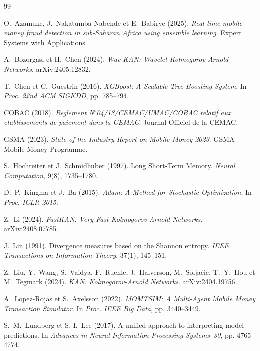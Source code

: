 \documentclass[11pt,a4paper,twocolumn]{article}
\begin{document}
\begin{thebibliography}{99}

O.~Azamuke, J.~Nakatumba-Nabende et E.~Babirye (2025).
\textit{Real-time mobile money fraud detection in sub-Saharan Africa
using ensemble learning}.
Expert Systems with Applications.

A.~Bozorgasl et H.~Chen (2024).
\textit{Wav-KAN: Wavelet Kolmogorov-Arnold Networks}.
arXiv:2405.12832.

T.~Chen et C.~Guestrin (2016).
\textit{XGBoost: A Scalable Tree Boosting System}.
In \textit{Proc. 22nd ACM SIGKDD}, pp. 785--794.

COBAC (2018).
\textit{Reglement N$^{\circ}$04/18/CEMAC/UMAC/COBAC relatif aux
etablissements de paiement dans la CEMAC}.
Journal Officiel de la CEMAC.

GSMA (2023).
\textit{State of the Industry Report on Mobile Money 2023}.
GSMA Mobile Money Programme.

S.~Hochreiter et J.~Schmidhuber (1997).
Long Short-Term Memory.
\textit{Neural Computation}, 9(8), 1735--1780.

D.~P.~Kingma et J.~Ba (2015).
\textit{Adam: A Method for Stochastic Optimization}.
In \textit{Proc. ICLR 2015}.

Z.~Li (2024).
\textit{FastKAN: Very Fast Kolmogorov-Arnold Networks}.
arXiv:2408.07785.

J.~Lin (1991).
Divergence measures based on the Shannon entropy.
\textit{IEEE Transactions on Information Theory}, 37(1), 145--151.

Z.~Liu, Y.~Wang, S.~Vaidya, F.~Ruehle, J.~Halverson,
M.~Soljacic, T.~Y.~Hou et M.~Tegmark (2024).
\textit{KAN: Kolmogorov-Arnold Networks}.
arXiv:2404.19756.

A.~Lopez-Rojas et S.~Axelsson (2022).
\textit{MOMTSIM: A Multi-Agent Mobile Money Transaction Simulator}.
In \textit{Proc. IEEE Big Data}, pp. 3440--3449.

S.~M.~Lundberg et S.-I.~Lee (2017).
A unified approach to interpreting model predictions.
In \textit{Advances in Neural Information Processing Systems~30},
pp. 4765--4774.

\end{thebibliography}
\end{document}
